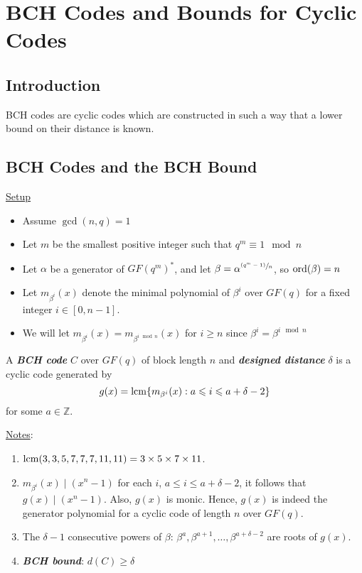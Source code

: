 \chapter{BCH Codes and Bounds for Cyclic Codes}
\section{Introduction}
BCH codes are cyclic codes which are constructed in such a way that
a lower bound on their distance is known.

\section{BCH Codes and the BCH Bound}
\underline{Setup}

\begin{itemize}
    \item Assume $ \gcd(n,q)=1 $
    \item Let $ m $ be the smallest positive integer such that $ q^m\equiv 1\mod n $
    \item Let $ \alpha $ be a generator of $ GF(q^m)^* $, and let
          $ \beta=\alpha^{\sfrac{(q^m-1)}{n}} $, so $ \operatorname{ord}(\beta)=n $
    \item Let $ m_{\beta^i}(x) $ denote the minimal polynomial of
          $ \beta^i $ over $ GF(q) $ for a fixed integer $ i\in[0,n-1] $.
    \item We will let $ m_{\beta^i}(x)=m_{\beta^{i\mod n}}(x) $
          for $ i\geqslant n $ since $ \beta^i=\beta^{i\mod n} $
\end{itemize}

\begin{defbox}
    \begin{definition}
        A \textbf{\emph{BCH code}} $ C $ over $ GF(q) $ of block
        length $ n $ and \textbf{\emph{designed distance}} $ \delta $
        is a cyclic code generated by
        \[ g(x)=\operatorname{lcm} \{m_{\beta^i}(x):a\leqslant i\leqslant a+\delta-2\} \]
        for some $ a\in\mathbb{Z} $.
    \end{definition}
\end{defbox}

\underline{Notes}:
\begin{enumerate}[label=(\roman*)]
    \item $ \operatorname{lcm}(3,3,5,7,7,7,11,11)=3\times 5\times 7\times 11 $.
    \item $ m_{\beta^i}(x)\mid (x^n-1) $ for each $ i $,
          $ a\leqslant i\leqslant a+\delta-2 $, it follows that $ g(x)\mid (x^n-1) $.
          Also, $ g(x) $ is monic. Hence, $ g(x) $ is indeed the generator polynomial
          for a cyclic code of length $ n $ over $ GF(q) $.
    \item The $ \delta-1 $ consecutive powers of $ \beta $:
          $ \beta^a,\beta^{a+1},\ldots ,\beta^{a+\delta-2} $
          are roots of $ g(x) $.
    \item \textbf{\emph{BCH bound}}: $ d(C)\geqslant \delta $
\end{enumerate}

